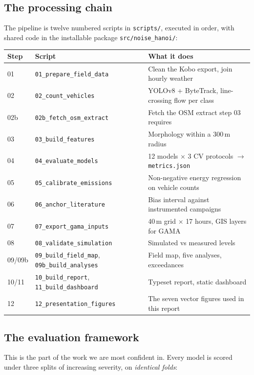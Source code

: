 \documentclass[11pt,a4paper]{article}
\newcommand{\pth}[1]{\texttt{\small #1}}
\begin{document}
\subsection{The processing chain}

The pipeline is twelve numbered scripts in \pth{scripts/}, executed in order,
with shared code in the installable package \pth{src/noise\_hanoi/}:

\begin{center}\small
\begin{tabular}{@{}llp{8.0cm}@{}}
\toprule
\textbf{Step} & \textbf{Script} & \textbf{What it does} \\
\midrule
01 & \pth{01\_prepare\_field\_data} & Clean the Kobo export, join hourly weather \\
02 & \pth{02\_count\_vehicles} & YOLOv8 + ByteTrack, line-crossing flow per class \\
02b & \pth{02b\_fetch\_osm\_extract} & Fetch the OSM extract step 03 requires \\
03 & \pth{03\_build\_features} & Morphology within a 300\,m radius \\
04 & \pth{04\_evaluate\_models} & 12 models $\times$ 3 CV protocols $\to$ \pth{metrics.json} \\
05 & \pth{05\_calibrate\_emissions} & Non-negative energy regression on vehicle counts \\
06 & \pth{06\_anchor\_literature} & Bias interval against instrumented campaigns \\
07 & \pth{07\_export\_gama\_inputs} & 40\,m grid $\times$ 17 hours, GIS layers for GAMA \\
08 & \pth{08\_validate\_simulation} & Simulated vs measured levels \\
09/09b & \pth{09\_build\_field\_map}, \pth{09b\_build\_analyses} & Field map, five analyses, exceedances \\
10/11 & \pth{10\_build\_report}, \pth{11\_build\_dashboard} & Typeset report, static dashboard \\
12 & \pth{12\_presentation\_figures} & The seven vector figures used in this report \\
\bottomrule
\end{tabular}
\end{center}

\subsection{The evaluation framework}

This is the part of the work we are most confident in. Every model is scored under
three splits of increasing severity, on \emph{identical folds}:
\end{document}

